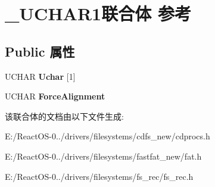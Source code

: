 \hypertarget{union___u_c_h_a_r1}{}\section{\+\_\+\+U\+C\+H\+A\+R1联合体 参考}
\label{union___u_c_h_a_r1}
\subsection*{Public 属性}
\begin{DoxyCompactItemize}
\item 
\mbox{\label{union___u_c_h_a_r1_ab2e39afe2e36461a1d4de36637eff926}} 
U\+C\+H\+AR {\bfseries Uchar} \mbox{[}1\mbox{]}
\item 
\mbox{\label{union___u_c_h_a_r1_a4243d079bd9a25cd2d5a51b09bbfde51}} 
U\+C\+H\+AR {\bfseries Force\+Alignment}
\end{DoxyCompactItemize}


该联合体的文档由以下文件生成\+:\begin{DoxyCompactItemize}
\item 
E\+:/\+React\+O\+S-\/0../drivers/filesystems/cdfs\+\_\+new/cdprocs.\+h\item 
E\+:/\+React\+O\+S-\/0../drivers/filesystems/fastfat\+\_\+new/fat.\+h\item 
E\+:/\+React\+O\+S-\/0../drivers/filesystems/fs\+\_\+rec/fs\+\_\+rec.\+h\end{DoxyCompactItemize}

